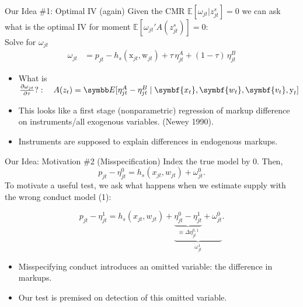 \documentclass[aspectratio=169,10pt]{beamer}
\begin{document}
\begin{frame}{Our Idea \#1: Optimal IV (again)}
Given the CMR $\mathbb{E}[\omega_{jt}  | z_{jt}^s]=0$ we can ask what is the optimal IV for moment $\mathbb{E}[\omega_{jt}' A(z_{jt}^s)]=0$:\\
\vspace{0.25cm}
Solve for $\omega_{jt}$
\begin{align*}
\omega_{jt} &= p_{jt} - h_s(\textrm{x}_{jt},\textrm{w}_{jt}) + \tau\, \eta_{jt}^A + (1-\tau)\,\eta_{jt}^B
\end{align*}
\begin{itemize}
  \item What is $\frac{\partial \omega_{jt}}{\partial \tau}?: \quad A(z_t) = \E[\eta_{jt}^A - \eta_{jt}^B \mid \symbf{x_t}, \symbf{w_t}, \symbf{v_t}, \textrm{y}_t]$
  \item This looks like a \alert{first stage} (nonparametric) regression of markup difference on instruments/all exogenous variables. (Newey 1990).
  \item Instruments are supposed to explain \alert{differences in endogenous markups}. 
\end{itemize}
\end{frame}


\begin{frame}[plain,label=misspecification]{Our Idea: Motivation \#2 (Misspecification)}
Index the \alert{true} model by $0$. Then,
$$ p_{jt} -\eta^0_{jt}= h_s(x_{jt},w_{jt}) + \omega^0_{jt}.$$
To motivate a useful test, we ask what happens when we estimate supply with the \alert{wrong} conduct model (1):

$$p_{jt} -\eta_{jt}^1 = h_s(x_{jt},w_{jt}) + \underbrace{\underbrace{\eta^0_{jt} - \eta^1_{jt}}_{\equiv \Delta \eta_{jt}^{0,1}} +  \omega_{jt}^{0}}_{\omega_{jt}^{1}}.$$
\begin{itemize}
\item Misspecifying conduct introduces an omitted variable: the difference in markups.
\item Our test is premised on detection of this omitted variable.
\end{itemize}
\end{frame}
\end{document}
